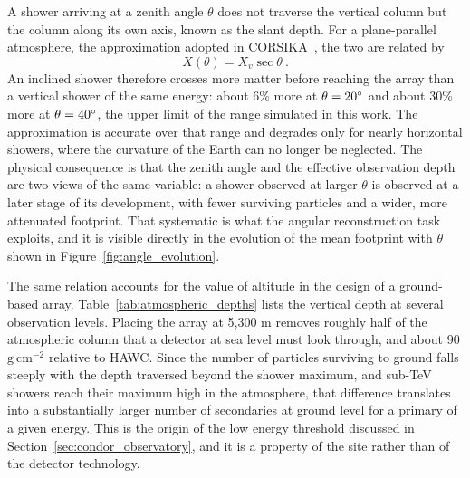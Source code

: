 A shower arriving at a zenith angle $\theta$ does not traverse the vertical column but the column along its own axis, known as the slant depth. For a plane-parallel atmosphere, the approximation adopted in CORSIKA~, the two are related by
\begin{equation}
    X(\theta) = X_v \sec\theta \ .
    \label{eq:slant_depth}
\end{equation}
An inclined shower therefore crosses more matter before reaching the array than a vertical shower of the same energy: about 6\% more at $\theta = 20\degree$ and about 30\% more at $\theta = 40\degree$, the upper limit of the range simulated in this work. The approximation is accurate over that range and degrades only for nearly horizontal showers, where the curvature of the Earth can no longer be neglected. The physical consequence is that the zenith angle and the effective observation depth are two views of the same variable: a shower observed at larger $\theta$ is observed at a later stage of its development, with fewer surviving particles and a wider, more attenuated footprint. That systematic is what the angular reconstruction task exploits, and it is visible directly in the evolution of the mean footprint with $\theta$ shown in Figure~\ref{fig:angle_evolution}.

The same relation accounts for the value of altitude in the design of a ground-based array. Table~\ref{tab:atmospheric_depths} lists the vertical depth at several observation levels. Placing the array at 5,300 m removes roughly half of the atmospheric column that a detector at sea level must look through, and about 90 $\mathrm{g \ cm}^{-2}$ relative to HAWC. Since the number of particles surviving to ground falls steeply with the depth traversed beyond the shower maximum, and sub-TeV showers reach their maximum high in the atmosphere, that difference translates into a substantially larger number of secondaries at ground level for a primary of a given energy. This is the origin of the low energy threshold discussed in Section~\ref{sec:condor_observatory}, and it is a property of the site rather than of the detector technology.

